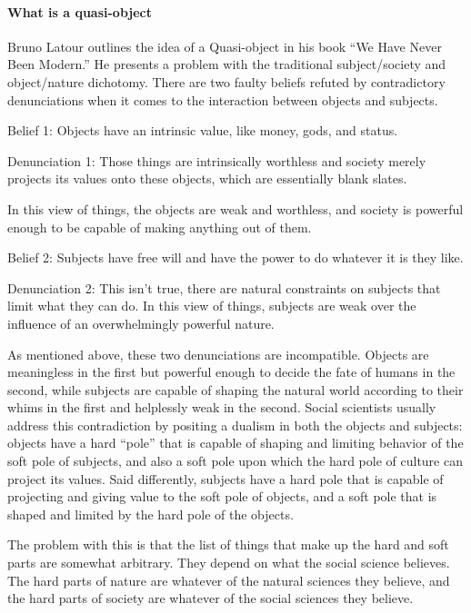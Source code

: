 \documentclass[a4paper]{article}
\begin{document}
\paragraph{What is a quasi-object}

Bruno Latour outlines the idea of a Quasi-object in his book ``We Have Never
Been Modern.'' He presents a problem with the traditional subject/society and
object/nature dichotomy. There are two faulty beliefs refuted by contradictory
denunciations when it comes to the interaction between objects and subjects. 

Belief 1: Objects have an intrinsic value, like money, gods, and status. 

Denunciation 1: Those things are intrinsically worthless and society merely
projects its values onto these objects, which are essentially blank slates.

In this view of things, the objects are weak and worthless, and society is
powerful enough to be capable of making anything out of them.

Belief 2: Subjects have free will and have the power to do whatever it is they
like.

Denunciation 2: This isn't true, there are natural constraints on subjects
that limit what they can do.  In this view of things, subjects are weak over
the influence of an overwhelmingly powerful nature.

As mentioned above, these two denunciations are incompatible. Objects are
meaningless in the first but powerful enough to decide the fate of humans in
the second, while subjects are capable of shaping the natural world according
to their whims in the first and helplessly weak in the second. Social
scientists usually address this contradiction by positing a dualism in both
the objects and subjects: objects have a hard ``pole'' that is capable of
shaping and limiting behavior of the soft pole of subjects, and also a soft
pole upon which the hard pole of culture can project its values. Said
differently, subjects have a hard pole that is capable of projecting and
giving value to the soft pole of objects, and a soft pole that is shaped and
limited by the hard pole of the objects.

The problem with this is that the list of things that make up the hard and
soft parts are somewhat arbitrary. They depend on what the social science
believes. The hard parts of nature are whatever of the natural sciences they
believe, and the hard parts of society are whatever of the social sciences
they believe. 
\end{document}
